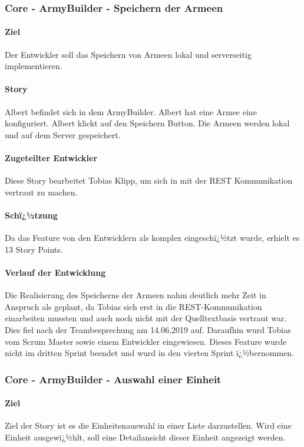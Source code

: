 \documentclass[12pt, titlepage]{scrartcl}
\begin{document}
		\subsubsection{Core - ArmyBuilder - Speichern der Armeen}
		\paragraph{Ziel} Der Entwickler soll das Speichern von Armeen lokal und serverseitig implementieren.
		\paragraph{Story} Albert befindet sich in dem ArmyBuilder. Albert hat eine Armee eine konfiguriert. Albert klickt auf den Speichern Button. Die Armeen werden lokal und auf dem Server gespeichert.
		\paragraph{Zugeteilter Entwickler} Diese Story bearbeitet Tobias Klipp, um sich in mit der REST Kommunikation vertraut zu machen.
		\paragraph{Schï¿½tzung}
		Da das Feature von den Entwicklern als komplex eingeschï¿½tzt wurde, erhielt es 13 Story Points.
		\paragraph{Verlauf der Entwicklung} Die Realisierung des Speicherns der Armeen nahm deutlich mehr Zeit in Anspruch als geplant, da Tobias sich erst in die REST-Kommunikation einarbeiten mussten und auch noch nicht mit der Quelltextbasis vertraut war. Dies fiel nach der Teambesprechung am 14.06.2019 auf. Daraufhin wurd Tobias vom Scrum Master sowie einem Entwickler eingewiesen. Dieses Feature wurde nicht im dritten Sprint beendet und wurd in den vierten Sprint ï¿½bernommen.
		
		\subsubsection{Core - ArmyBuilder - Auswahl einer Einheit}
		\paragraph{Ziel} Ziel der Story ist es die Einheitenauswahl in einer Liste darzustellen. Wird eine Einheit ausgewï¿½hlt, soll eine Detailansicht dieser Einheit angezeigt werden.
\end{document}
